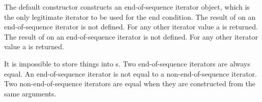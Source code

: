 \pnum
{}%
The default constructor constructs
an end-of-sequence iterator object, which is the only legitimate
iterator to be used for the end condition. The result of  on
an end-of-sequence iterator is not defined. For any other iterator value a
 is returned.
The result of  on an end-of-sequence iterator
is not defined. For any other iterator value a  is returned.

\pnum
{}%
It is impossible to store things
into s. Two end-of-sequence iterators are always
equal. An end-of-sequence iterator is not equal to a
non-end-of-sequence iterator. Two non-end-of-sequence iterators are
equal when they are constructed from the same arguments.

